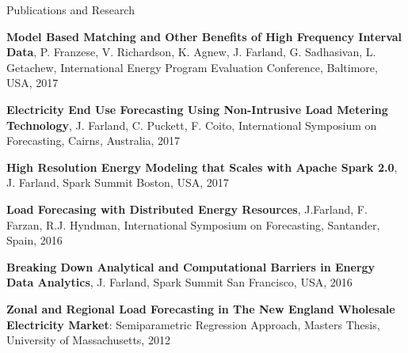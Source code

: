 \documentclass{resume} %
\begin{document}
\begin{rSection}{Publications and Research}

\item {\bf Model Based Matching and Other Benefits of High Frequency Interval Data}, P. Franzese, V. Richardson, K. Agnew, J. Farland, G. Sadhasivan, L. Getachew, International Energy Program Evaluation Conference, Baltimore, USA, 2017

\item {\bf Electricity End Use Forecasting Using Non-Intrusive Load Metering Technology}, J. Farland, C. Puckett, F. Coito, International Symposium on Forecasting, Cairns, Australia, 2017

\item {\bf High Resolution Energy Modeling that Scales with Apache Spark 2.0}, J. Farland, Spark Summit Boston, USA, 2017

\item {\bf Load Forecasing with Distributed Energy Resources}, J.Farland, F. Farzan, R.J. Hyndman, International Symposium on Forecasting, Santander, Spain, 2016

\item {\bf Breaking Down Analytical and Computational Barriers in Energy Data Analytics}, J. Farland, Spark Summit San Francisco, USA, 2016

\item {\bf  Zonal and Regional Load Forecasting in The New England Wholesale Electricity Market}: Semiparametric Regression Approach, Masters Thesis, University of Massachusetts, 2012

\end{rSection}

\end{document}
